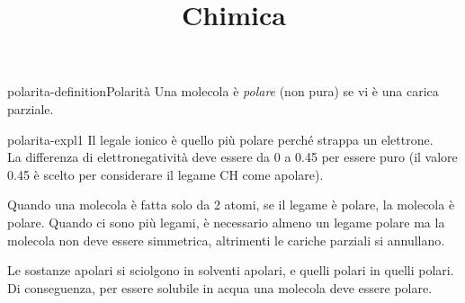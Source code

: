\documentclass[preview]{standalone}
\begin{document}
\title{Chimica}
\genpage

\begin{snippetdefinition}{polarita-definition}{Polarità}
    Una molecola è \textit{polare} (non pura) se vi è una carica parziale.
\end{snippetdefinition}

\begin{snippet}{polarita-expl1}
    Il legale ionico è quello più polare perché strappa un elettrone. \\
    La differenza di elettronegatività deve essere da 0 a 0.45 per essere puro
    (il valore 0.45 è scelto per considerare il legame CH come apolare).

    Quando una molecola è fatta solo da 2 atomi, 
    se il legame è polare, la molecola è polare.
    Quando ci sono più legami, è necessario almeno un legame polare
    ma la molecola non deve essere simmetrica, altrimenti le cariche parziali si annullano.

    Le sostanze apolari si sciolgono in solventi apolari, e quelli polari in quelli polari.
    Di conseguenza, per essere solubile in acqua una molecola deve essere polare.
\end{snippet}
\end{document}
